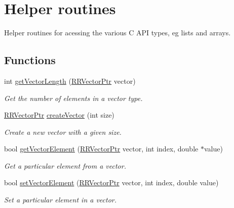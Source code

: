 \hypertarget{group__helper_routines}{\section{Helper routines}
\label{group__helper_routines}
}


Helper routines for acessing the various C A\-P\-I types, eg lists and arrays.  


\subsection*{Functions}
\begin{DoxyCompactItemize}
\item 
int \hyperlink{group__helper_routines_ga36649ac03ad15ad8242f03ff9d28b0a9}{get\-Vector\-Length} (\hyperlink{rrc__types_8h_a3be72d6006034fd349f753d2bf441bf7}{R\-R\-Vector\-Ptr} vector)
\begin{DoxyCompactList}\small\item\em Get the number of elements in a vector type. \end{DoxyCompactList}\item 
\hyperlink{rrc__types_8h_a3be72d6006034fd349f753d2bf441bf7}{R\-R\-Vector\-Ptr} \hyperlink{group__helper_routines_gac903628f96b1bf2308fa4a79b189cc1c}{create\-Vector} (int size)
\begin{DoxyCompactList}\small\item\em Create a new vector with a given size. \end{DoxyCompactList}\item 
bool \hyperlink{group__helper_routines_ga10140bb46cc906a75e575c81022a9f2a}{get\-Vector\-Element} (\hyperlink{rrc__types_8h_a3be72d6006034fd349f753d2bf441bf7}{R\-R\-Vector\-Ptr} vector, int index, double $\ast$value)
\begin{DoxyCompactList}\small\item\em Get a particular element from a vector. \end{DoxyCompactList}\item 
bool \hyperlink{group__helper_routines_gaca70bc807a455ec497b7d8e8a2affe45}{set\-Vector\-Element} (\hyperlink{rrc__types_8h_a3be72d6006034fd349f753d2bf441bf7}{R\-R\-Vector\-Ptr} vector, int index, double value)
\begin{DoxyCompactList}\small\item\em Set a particular element in a vector. \end{DoxyCompactList}\item 

\end{DoxyCompactItemize}
